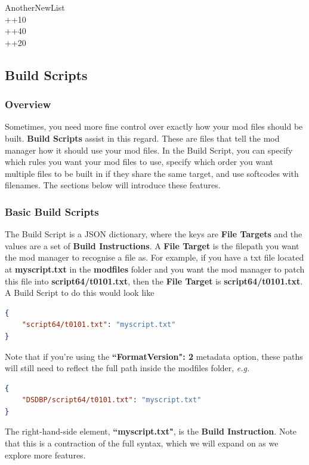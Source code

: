 \documentclass{article}
\begin{document}
\noindent AnotherNewList\\
++10\\
++40\\
++20\\
\textminus{}

\newpage
\subsection{Build Scripts}\label{Section:BuildScripts}
\subsubsection{Overview}
Sometimes, you need more fine control over exactly how your mod files should be built. \textbf{Build Scripts} assist in this regard. These are files that tell the mod manager how it should use your mod files. In the Build Script, you can specify which rules you want your mod files to use, specify which order you want multiple files to be built in if they share the same target, and use softcodes with filenames. The sections below will introduce these features.

\subsubsection{Basic Build Scripts}
The Build Script is a JSON dictionary, where the keys are \textbf{File Targets} and the values are a set of \textbf{Build Instructions}. 
A \textbf{File Target} is the filepath you want the mod manager to recognise a file as. For example, if you have a txt file located at \textbf{myscript.txt} in the \textbf{modfiles} folder and you want the mod manager to patch this file into \textbf{script64/t0101.txt}, then the \textbf{File Target} is \textbf{script64/t0101.txt}. A Build Script to do this would look like
\begin{lstlisting}[language=json,firstnumber=1]
{
    "script64/t0101.txt": "myscript.txt"
}
\end{lstlisting}
Note that if you're using the \textbf{``FormatVersion": 2} metadata option, these paths will still need to reflect the full path inside the modfiles folder, \textit{e.g.}
\begin{lstlisting}[language=json,firstnumber=1]
{
    "DSDBP/script64/t0101.txt": "myscript.txt"
}
\end{lstlisting}
\noindent
The right-hand-side element, \textbf{``myscript.txt"}, is the \textbf{Build Instruction}. Note that this is a contraction of the full syntax, which we will expand on as we explore more features.
\end{document}
